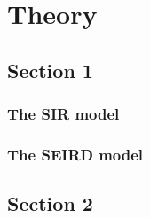 
\chapter{Theory} %

\label{Theory} %


\section{Section 1}
\subsection{The SIR model}
\label{sec:SIR}


\subsection{The SEIRD model}
\label{sec:SEIRD}


\section{Section 2}

